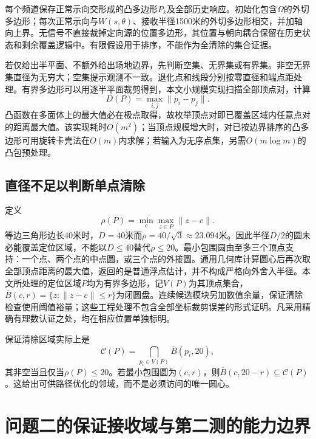 \documentclass[UTF8,a4paper,zihao=-4,fontset=fandol]{ctexart}
\begin{document}
每个频道保存正常示向交形成的凸多边形$P_k$及全部历史响应。初始化包含$\Omega$的外切多边形；每次正常示向与$W(s,\theta)$、接收半径1500米的外切多边形相交，并加轴向上界。无信号不直接裁掉定向源的位置多边形，其位置与朝向耦合保留在历史状态和剩余覆盖逻辑中。有限假设用于排序，不能作为全清除的集合证据。

若仅给出半平面、不额外给出场地边界，先判断空集、无界集或有界集。非空无界集直径为无穷大；空集提示观测不一致。退化点和线段分别按零直径和端点距处理。有界多边形可以用逐半平面裁剪得到，本文小规模实现扫描全部顶点对，计算
\begin{equation}D(P)=\max_{i,j}\|p_i-p_j\|.\end{equation}
凸函数在多面体上的最大值必在极点取得，故枚举顶点对即已覆盖区域内任意点对的距离最大值。该实现耗时$O(m^2)$；当顶点规模增大时，对已按边界排序的凸多边形可用旋转卡壳法在$O(m)$内求解；若输入为无序点集，另需$O(m\log m)$的凸包预处理。

\subsection{直径不足以判断单点清除}
定义
\begin{equation}\rho(P)=\min_c\max_{z\in P}\|z-c\|.\end{equation}
等边三角形边长40米时，$D=40$米而$\rho=40/\sqrt3\approx23.094$米。因此半径$D/2$的圆未必能覆盖定位区域，不能以$D\le40$替代$\rho\le20$。最小包围圆由至多三个顶点支持：一个点、两个点的中点圆，或三个点的外接圆。通用几何库计算圆心后再次取全部顶点距离的最大值，返回的是普通浮点估计，并不构成严格向外舍入半径。本文所处理的定位区域$P$均为有界多边形，记$V(P)$为其顶点集合，$\overline B(c,r)=\{z:\|z-c\|\le r\}$为闭圆盘。连续候选模块另加数值余量，保证清除检查使用阈值裕量；这些工程处理不包含全部坐标裁剪误差的形式证明。凡采用精确有理数认证之处，均在相应位置单独标明。

保证清除区域实际上是
\begin{equation}\label{eq:clearset}\mathcal C(P)=\bigcap_{p_i\in V(P)}\overline B(p_i,20),\end{equation}
其非空当且仅当$\rho(P)\le20$。若最小包围圆为$(c,r)$，则$\overline B(c,20-r)\subseteq\mathcal C(P)$。这给出可供路径优化的邻域，而不是必须访问的唯一圆心。

\section{问题二的保证接收域与第二测的能力边界}
\end{document}
